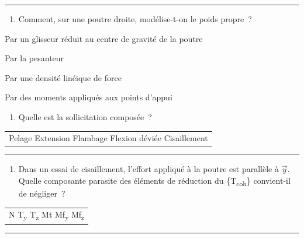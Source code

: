 \begin{center}\rule{0.5\linewidth}{0.5pt}\end{center}

\begin{enumerate}
\def\labelenumi{\arabic{enumi}.}
\setcounter{enumi}{18}
\tightlist
\item
  Comment, sur une poutre droite, modélise-t-on le poids propre~?
\end{enumerate}

Par un glisseur réduit au centre de gravité de la poutre

Par la pesanteur

Par une densité linéique de force

Par des moments appliqués aux points d'appui

\begin{enumerate}
\def\labelenumi{\arabic{enumi}.}
\setcounter{enumi}{19}
\tightlist
\item
  Quelle est la sollicitation composée~?
\end{enumerate}

\begin{longtable}[]{@{}l@{}}
\toprule\noalign{}
\endhead
\bottomrule\noalign{}
\endlastfoot
Pelage Extension Flambage Flexion déviée Cisaillement \\
\end{longtable}

\begin{center}\rule{0.5\linewidth}{0.5pt}\end{center}

\begin{enumerate}
\def\labelenumi{\arabic{enumi}.}
\setcounter{enumi}{20}
\tightlist
\item
  Dans un essai de cisaillement, l'effort appliqué à la poutre est parallèle à \(\overrightarrow{y}\). Quelle composante parasite des éléments de réduction du \{T\textsubscript{coh}\} convient-il de négliger~?
\end{enumerate}

\begin{longtable}[]{@{}l@{}}
\toprule\noalign{}
\endhead
\bottomrule\noalign{}
\endlastfoot
N T\textsubscript{y} T\textsubscript{z} Mt Mf\textsubscript{y} Mf\textsubscript{z} \\
\end{longtable}

\begin{center}\rule{0.5\linewidth}{0.5pt}\end{center}

